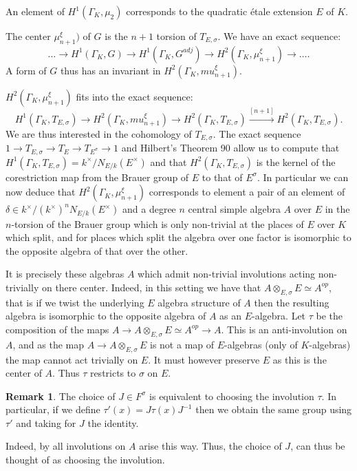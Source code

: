\documentclass{article}
\theoremstyle{plain}
\theoremstyle{definition}
\newtheorem{remark}[theorem]{Remark}
\numberwithin{equation}{section}
\newcommand{\GalKbK}{\Gamma_K}
\begin{document}
An element of $H^1(\GalKbK, \mu_2)$ corresponds to the quadratic \'etale extension $E$ of $K$.

The center $\mu_{n+1}^\xi)$ of $G$ is the $n+1$ torsion of $T_{E,\sigma}$.
We have an exact sequence:
\[ \ldots \rightarrow H^1(\GalKbK,G) \rightarrow H^1(\GalKbK, G^{adj}) \rightarrow H^2(\GalKbK, \mu_{n+1}^\xi) \rightarrow \ldots. \]
A form of $G$ thus has an invariant in $H^2(\GalKbK, mu_{n+1}^\xi)$.

$H^2(\GalKbK, \mu_{n+1}^\xi)$ fits into the exact sequence:
\[ H^1(\GalKbK, T_{E,\sigma}) \rightarrow H^2(\GalKbK, mu_{n+1}^\xi) \rightarrow H^2(\GalKbK, T_{E,\sigma}) \overset{[n+1]}\rightarrow H^2(\GalKbK, T_{E,\sigma}). \]
We are thus interested in the cohomology of $T_{E,\sigma}$.
The exact sequence $1 \rightarrow T_{E,\sigma} \rightarrow T_E \rightarrow T_{E^\sigma} \rightarrow 1$ and Hilbert's Theorem 90 allow us to compute that 
$H^1(\GalKbK, T_{E,\sigma}) = k^\times/N_{E/k}(E^\times)$ and that $H^2(\GalKbK, T_{E,\sigma})$ is the kernel of the corestriction map from the Brauer group of $E$ to that of $E^\sigma$.
In particular we can now deduce that $H^2(\GalKbK, \mu_{n+1}^\xi)$ corresponds to element a pair of an element of $\delta\in k^\times/(k^\times)^nN_{E/k}(E^\times)$ and a degree $n$ central simple algebra $A$ over $E$ in the $n$-torsion of the Brauer group which is only non-trivial at the places of $E$ over $K$ which split, and for places which split the algebra over one factor is isomorphic to the opposite algebra of that over the other.

It is precisely these algebras $A$ which admit non-trivial involutions acting non-trivially on there center.
Indeed, in this setting we have that $A \otimes_{E,\sigma} E \simeq A^{op}$, that is if we twist the underlying $E$ algebra structure of $A$ then the resulting algebra is isomorphic to the opposite algebra of $A$ as an $E$-algebra. Let $\tau$ be the composition of the maps $A \rightarrow A \otimes_{E,\sigma} E \simeq A^{op} \rightarrow A$. This is an anti-involution on $A$, and as the map $A \rightarrow A \otimes_{E,\sigma} E $ is not a map of $E$-algebras (only of $K$-algebras) the map cannot act trivially on $E$. It must however preserve $E$ as this is the center of $A$. Thus $\tau$ restricts to $\sigma$ on $E$.

\begin{remark}
The choice of $J\in F^\sigma$ is equivalent to choosing the involution $\tau$.
In particular, if we define $\tau'(x) = J\tau(x)J^{-1}$ then we obtain the same group using $\tau'$ and taking for $J$ the identity.

Indeed, by \cite[Prop. 2.18]{The Book of Involutions TODO} all involutions on $A$ arise this way.
Thus, the choice of $J$, can thus be thought of as choosing the involution.
\end{remark}
\end{document}
